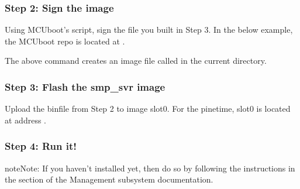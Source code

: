 \documentclass[letterpaper,10pt,english]{sphinxmanual}
\begin{document}


\subsubsection{Step 2: Sign the image}
\label{\detokenize{fota/smp_svr:step-2-sign-the-image}}
Using MCUboot’s  script, sign the 
file you built in Step 3. In the below example, the MCUboot repo is located at
.

\begin{sphinxVerbatim}[commandchars=\\\{\}]
\end{sphinxVerbatim}

The above command creates an image file called  in the
current directory.


\subsubsection{Step 3: Flash the smp\_svr image}
\label{\detokenize{fota/smp_svr:step-3-flash-the-smp-svr-image}}
Upload the bin\sphinxhyphen{}file from Step 2 to image slot\sphinxhyphen{}0.
For the pinetime, slot\sphinxhyphen{}0 is located at address .

\begin{sphinxVerbatim}[commandchars=\\\{\}]
\end{sphinxVerbatim}


\subsubsection{Step 4: Run it!}
\label{\detokenize{fota/smp_svr:step-4-run-it}}
\begin{sphinxadmonition}{note}{Note:}
If you haven’t installed  yet, then do so by following the
instructions in the  section of the Management subsystem
documentation.
\end{sphinxadmonition}
\end{document}
